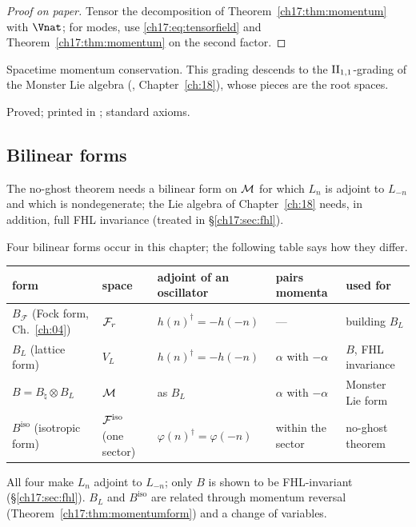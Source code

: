 \begin{proof}[Proof on paper]
Tensor the decomposition of Theorem~\ref{ch17:thm:momentum} with $\Vnat$; for modes, use
\eqref{ch17:eq:tensorfield} and Theorem~\ref{ch17:thm:momentum} on the second factor.
\end{proof}

\begin{physics}
Spacetime momentum conservation.  This grading descends to the ${\mathrm{II}_{1,1}}$-grading of the Monster Lie algebra
(, Chapter~\ref{ch:18}), whose pieces are the root spaces.
\end{physics}

\begin{status}
Proved; printed in ; standard axioms.
\end{status}

\subsection{Bilinear forms}

The no-ghost theorem needs a bilinear form on $\mathcal{M}$ for which $L_n$ is adjoint to $L_{-n}$ and which is
nondegenerate; the Lie algebra of Chapter~\ref{ch:18} needs, in addition, full FHL invariance (treated in
\S\ref{ch17:sec:fhl}).

Four bilinear forms occur in this chapter; the following table says how they differ.
\begin{center}
\small
\begin{tabular}{p{}p{}p{}p{}p{}}
\toprule
form & space & adjoint of an oscillator & pairs momenta & used for \\ \midrule
$B_{\mathcal F}$ (Fock form, Ch.~\ref{ch:04}) & $\mathcal{F}_r$ & $h(n)^\dagger=-h(-n)$ & --- & building $B_L$ \\
$B_L$ (lattice form) & $V_L$ & $h(n)^\dagger=-h(-n)$ & $\alpha$ with $-\alpha$ & $B$, FHL invariance \\
$B=B_\natural\otimes B_L$ & $\mathcal{M}$ & as $B_L$ & $\alpha$ with $-\alpha$ & Monster Lie form \\
$B^{\mathrm{iso}}$ (isotropic form) & $\mathcal{F}^{\mathrm{iso}}$ (one sector) & $\varphi(n)^\dagger=\varphi(-n)$ & within the sector & no-ghost theorem \\
\bottomrule
\end{tabular}
\end{center}
All four make $L_n$ adjoint to $L_{-n}$; only $B$ is shown to be FHL-invariant (\S\ref{ch17:sec:fhl}).  $B_L$ and
$B^{\mathrm{iso}}$ are related through momentum reversal (Theorem~\ref{ch17:thm:momentumform}) and a change of variables.

